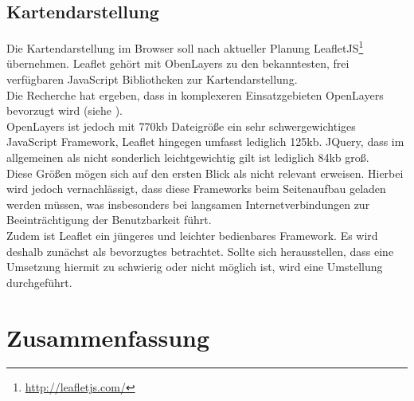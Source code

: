 \documentclass[10pt,conference,compsocconf]{IEEEtran}
\begin{document}
\subsection{Kartendarstellung}
Die Kartendarstellung im Browser soll nach aktueller Planung LeafletJS\footnote{\url{http://leafletjs.com/}} übernehmen. Leaflet gehört mit ObenLayers zu den bekanntesten, frei verfügbaren JavaScript Bibliotheken zur Kartendarstellung.\\
Die Recherche hat ergeben, dass in komplexeren Einsatzgebieten OpenLayers bevorzugt wird (siehe \cite{mariuszMaster} \cite{quads} \cite{wms_flow_mapping}).\\
OpenLayers ist jedoch mit 770kb Dateigröße ein sehr schwergewichtiges JavaScript Framework, Leaflet hingegen umfasst lediglich 125kb. JQuery, dass im allgemeinen als nicht sonderlich leichtgewichtig gilt ist lediglich 84kb groß.\\
Diese Größen mögen sich auf den ersten Blick als nicht relevant erweisen. Hierbei wird jedoch vernachlässigt, dass diese Frameworks beim Seitenaufbau geladen werden müssen, was insbesonders bei langsamen Internetverbindungen zur Beeinträchtigung der Benutzbarkeit führt.\\
Zudem ist Leaflet ein jüngeres und leichter bedienbares Framework. Es wird deshalb zunächst als bevorzugtes betrachtet. Sollte sich herausstellen, dass eine Umsetzung hiermit zu schwierig oder nicht möglich ist, wird eine Umstellung durchgeführt.


\section{Zusammenfassung}





\end{document}
